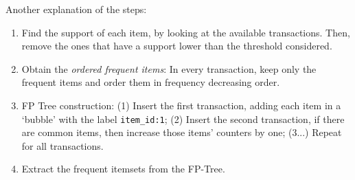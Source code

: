     Another explanation of the steps:
    \begin{enumerate}
      \item Find the support of each item, by looking at the available transactions. Then, remove the ones that have a support lower than the threshold considered.
      \item Obtain the \emph{ordered frequent items}: In every transaction, keep only the frequent items and order them in frequency decreasing order.
      \item FP Tree construction: (1) Insert the first transaction, adding each item in a `bubble' with the label \texttt{item\_id:1}; (2) Insert the second transaction, if there are common items, then increase those items' counters by one; (3...) Repeat for all transactions.
      \item Extract the frequent itemsets from the FP-Tree.
    \end{enumerate}

